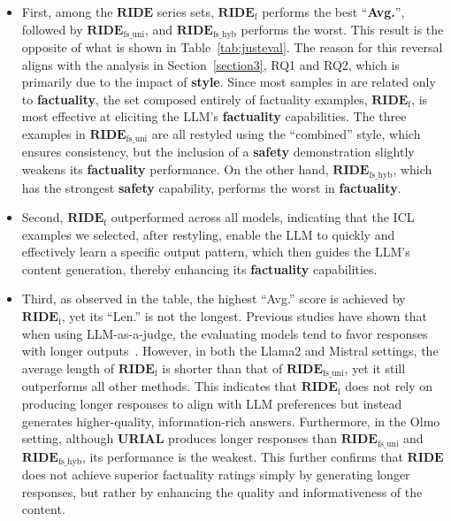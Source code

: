 \begin{itemize}

\item First, among the $\textbf{RIDE}$ series sets, $\textbf{RIDE}_{\text{f}}$ performs the best ``\textbf{Avg.}'', followed by $\textbf{RIDE}_{\text{fs\_uni}}$, and $\textbf{RIDE}_{\text{fs\_hyb}}$ performs the worst. 
This result is the opposite of what is shown in Table~\ref{tab:justeval}.
The reason for this reversal aligns with the analysis in Section~\ref{section3}, RQ1 and RQ2, which is primarily due to the impact of \textbf{style}.
Since most samples in \alpaca{} are related only to \textbf{\color{myblue} factuality}, the set composed entirely of factuality examples, $\textbf{RIDE}_{\text{f}}$, is most effective at eliciting the LLM’s \textbf{\color{myblue} factuality} capabilities.
The three examples in $\textbf{RIDE}_{\text{fs\_uni}}$ are all restyled using the ``combined'' style, which ensures consistency, but the inclusion of a \textbf{\color{myred} safety} demonstration slightly weakens its \textbf{\color{myblue} factuality} performance. 
On the other hand, $\textbf{RIDE}_{\text{fs\_hyb}}$, which has the strongest \textbf{\color{myred} safety} capability, performs the worst in \textbf{\color{myblue} factuality}.

\item Second, $\textbf{RIDE}_{\text{f}}$ outperformed \methodname{} across all models, indicating that the ICL examples we selected, after restyling, enable the LLM to quickly and effectively learn a specific output pattern, which then guides the LLM’s content generation, thereby enhancing its \textbf{\color{myblue} factuality} capabilities.

\item Third, as observed in the table, the highest ``Avg.'' score is achieved by $\textbf{RIDE}_{\text{f}}$, yet its ``Len.'' is not the longest.
Previous studies have shown that when using LLM-as-a-judge, the evaluating models tend to favor responses with longer outputs~\citep{DBLP:journals/corr/abs-2404-04475}. However, in both the Llama2 and Mistral settings, the average length of $\textbf{RIDE}_{\text{f}}$ is shorter than that of $\textbf{RIDE}_{\text{fs\_uni}}$, yet it still outperforms all other methods. This indicates that $\textbf{RIDE}_{\text{f}}$ does not rely on producing longer responses to align with LLM preferences but instead generates higher-quality, information-rich answers.
Furthermore, in the Olmo setting, although \textbf{URIAL} produces longer responses than $\textbf{RIDE}_{\text{fs\_uni}}$ and $\textbf{RIDE}_{\text{fs\_hyb}}$, its performance is the weakest. This further confirms that $\textbf{RIDE}$ does not achieve superior factuality ratings simply by generating longer responses, but rather by enhancing the quality and informativeness of the content.

\end{itemize}

